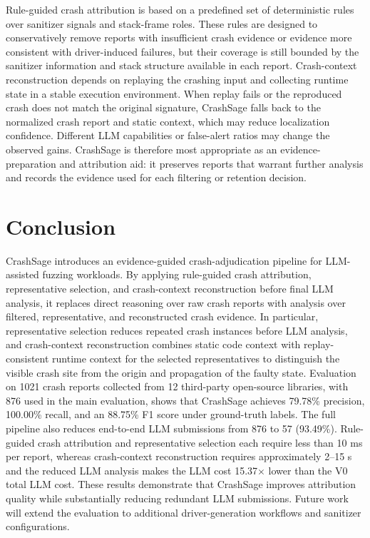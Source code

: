 \documentclass[pdflatex,sn-basic]{sn-jnl}%
\theoremstyle{thmstyleone}%
\theoremstyle{thmstyletwo}%
\theoremstyle{thmstylethree}%
\begin{document}
Rule-guided crash attribution is based on a predefined set of deterministic rules over sanitizer signals and stack-frame roles. These rules are designed to conservatively remove reports with insufficient crash evidence or evidence more consistent with driver-induced failures, but their coverage is still bounded by the sanitizer information and stack structure available in each report. Crash-context reconstruction depends on replaying the crashing input and collecting runtime state in a stable execution environment. When replay fails or the reproduced crash does not match the original signature, CrashSage falls back to the normalized crash report and static context, which may reduce localization confidence. Different LLM capabilities or false-alert ratios may change the observed gains. CrashSage is therefore most appropriate as an evidence-preparation and attribution aid: it preserves reports that warrant further analysis and records the evidence used for each filtering or retention decision.

\FloatBarrier

\section{Conclusion}
\label{sec:conclusion}

CrashSage introduces an evidence-guided crash-adjudication pipeline for LLM-assisted fuzzing workloads. By applying rule-guided crash attribution, representative selection, and crash-context reconstruction before final LLM analysis, it replaces direct reasoning over raw crash reports with analysis over filtered, representative, and reconstructed crash evidence. In particular, representative selection reduces repeated crash instances before LLM analysis, and crash-context reconstruction combines static code context with replay-consistent runtime context for the selected representatives to distinguish the visible crash site from the origin and propagation of the faulty state. Evaluation on 1021 crash reports collected from 12 third-party open-source libraries, with 876 used in the main evaluation, shows that CrashSage achieves 79.78\% precision, 100.00\% recall, and an 88.75\% F1 score under ground-truth labels. The full pipeline also reduces end-to-end LLM submissions from 876 to 57 (93.49\%). Rule-guided crash attribution and representative selection each require less than 10 ms per report, whereas crash-context reconstruction requires approximately 2--15 s and the reduced LLM analysis makes the LLM cost 15.37$\times$ lower than the V0 total LLM cost. These results demonstrate that CrashSage improves attribution quality while substantially reducing redundant LLM submissions. Future work will extend the evaluation to additional driver-generation workflows and sanitizer configurations.
\end{document}
